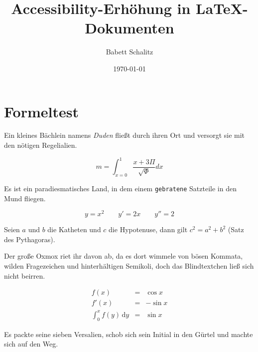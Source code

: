 \documentclass[%
	12pt,%
	a4paper,%
	oneside,%
	listof=totoc,
 	index=totoc,
	bibliography = totoc,
	parskip = half,%
	chapterprefix=false,%
	appendixprefix, %
headings=small,%
]{scrreprt}
\newcommand{\alt}[1]{}%
\begin{document}
\title{Accessibility-Erhöhung in \LaTeX-Dokumenten}
\author{Babett Schalitz}
\date{\today}
%
\maketitle

\tableofcontents

\listoffigures
\listoftables

\chapter{Formeltest}
\label{sec:Formeltest}

Ein kleines Bächlein namens \emph{Duden} fließt durch ihren Ort und versorgt sie mit den nötigen Regelialien.

\[ \alt{m = int^{1}_{x=0}{frac{x + 3 Pi}{sqrt{Phi}}} dx} m = \int^{1}_{x=0}{\frac{x + 3 \Pi}{\sqrt{\Phi}}} dx \]

Es ist ein paradiesmatisches Land, in dem einem \texttt{gebratene} Satzteile in den Mund fliegen. 

\begin{displaymath}
\alt{y=x^{2} y'=2x y''=2}
y=x^{2} \qquad
y'=2x \qquad
y''=2
\end{displaymath}

Seien \(\alt{a}a\) und \(\alt{b}b\) die Katheten und \(\alt{c}c\) die Hypotenuse, dann gilt \(\alt{c^{2}=a^{2}+b^{2}} c^{2}=a^{2}+b^{2}\) (Satz des Pythagoras).

Der große Oxmox riet ihr davon ab, da es dort wimmele von bösen Kommata, wilden Fragezeichen und hinterhältigen Semikoli, doch das Blindtextchen ließ sich nicht beirren. 

\begin{eqnarray}
\alt{f(x) = cos x  f'(x) = -sin x   int_{0}^{x} f(y),mathrm{d}y = sin x}
f(x) & = & \cos x \\
f'(x) & = & -\sin x \\
\int_{0}^{x} f(y)\,\mathrm{d}y &
= & \sin x
\end{eqnarray}

Es packte seine sieben Versalien, schob sich sein Initial in den Gürtel und machte sich auf den Weg.

\end{document}
